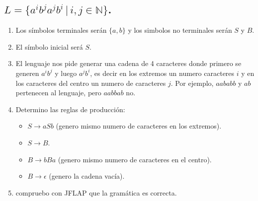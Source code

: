 \documentclass{article}
\begin{document}
        \subsection{$L = \{a^i b^j a^j b^i \, | \, i, j \in \mathbb{N}\}$.}
        \begin{flushleft}
            \begin{enumerate}

                \item Los símbolos terminales serán $\{a,b\}$ y los simbolos no terminales serán $S$ y $B$.

                \item El símbolo inicial será $S$.
            
                \item El lenguaje nos pide generar una cadena de 4 caracteres donde primero se generen $a^i b^j$ y luego $a^j b^i$, es decir en los extremos un numero caracteres $i$ y en los caracteres del centro un numero de caracteres $j$. 
                Por ejemplo, $aababb$ y $ab$ pertenecen al lenguaje, pero $aabbab$ no.

                \item Determino las reglas de producción:
                \begin{itemize}
                    \item $S \rightarrow aSb$ (genero mismo numero de caracteres en los extremos).
                    \item $S \rightarrow B$.
                    \item $B \rightarrow bBa$ (genero mismo numero de caracteres en el centro).
                    \item $B \rightarrow \epsilon$ (genero la cadena vacía).
                \end{itemize}

                \item compruebo con JFLAP que la gramática es correcta.


\end{enumerate}
\end{flushleft}
\end{document}
